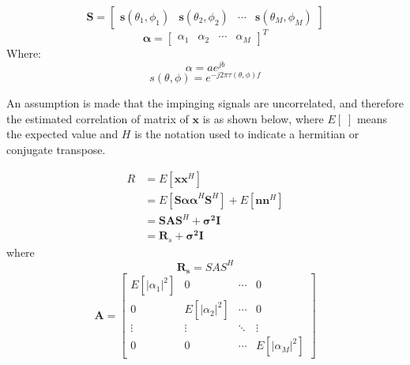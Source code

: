 \documentclass{UoNMCHA}
\numberwithin{equation}{section}
\begin{document}
    \begin{equation}
        \mathbf{S}=
        \begin{bmatrix}
            \mathbf{s}(\theta_1,\phi_1) & \mathbf{s}(\theta_2,\phi_2) & \cdots & \mathbf{s}(\theta_M,\phi_M)
        \end{bmatrix}
    \end{equation}
    \begin{equation}
        \mathbf{\alpha}=
        \begin{bmatrix}
        \alpha_1 & \alpha_2 & \cdots & \alpha_M
        \end{bmatrix}
        ^T
    \end{equation}
    Where:
    \begin{equation}
        \alpha = ae^{jb}
    \end{equation}
    \begin{equation}
        s(\theta,\phi)=e^{-j2\pi \tau(\theta,\phi) f}
    \end{equation}
    
    An assumption is made that the impinging signals are uncorrelated, and therefore the estimated correlation of matrix of $\mathbf{x}$ is as shown below, where $E[\;]$ means the expected value and $H$ is the notation used to indicate a hermitian or conjugate transpose.
    
    \begin{equation}
    \begin{split}
        R & =  E[\mathbf{xx}^H] \\
        & = E[\mathbf{S\alpha\alpha}^H\mathbf{S}^H] + E[\mathbf{nn}^H] \\
        & = \mathbf{SAS}^H + \mathbf{\sigma^2I}\\
        & = \mathbf{R}_s + \mathbf{\sigma^2 I}
    \end{split}
    \end{equation}
    where
    \begin{equation}
        \mathbf{R_s} = SAS^H
    \end{equation}
    \begin{equation} 
    \mathbf{A} = 
    \begin{bmatrix}
        E[|\alpha_1|^2] & 0 & \dotsm & 0\\ 
        0 & E[|\alpha_2|^2] & \dotsm & 0\\ 
        \vdots & \vdots & \ddots & \vdots\\ 
        0 & 0 & \dotsm & E[|\alpha_M|^2]
    \end{bmatrix}
    \end{equation}
    
\end{document}
